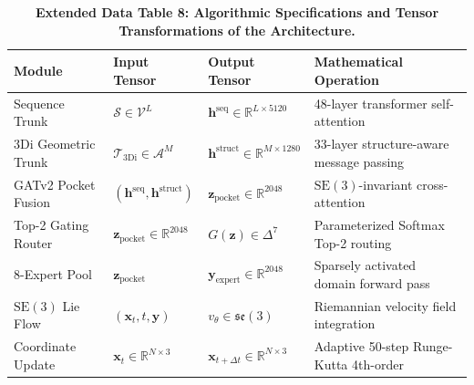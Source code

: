 \documentclass[11pt,a4paper]{article}
\begin{document}
\begin{table}[h!]
\caption{\textbf{Extended Data Table 8: Algorithmic Specifications and Tensor Transformations of the Architecture.}}
\label{tab:ed_tensors}
\centering
\small
\begin{tabular}{lllp{5.5cm}}
\toprule
\textbf{Module} & \textbf{Input Tensor} & \textbf{Output Tensor} & \textbf{Mathematical Operation} \\
\midrule
Sequence Trunk & $\mathcal{S} \in \mathcal{V}^L$ & $\mathbf{h}^{\text{seq}} \in \mathbb{R}^{L \times 5120}$ & 48-layer transformer self-attention \\
3Di Geometric Trunk & $\mathcal{T}_{\text{3Di}} \in \mathcal{A}^M$ & $\mathbf{h}^{\text{struct}} \in \mathbb{R}^{M \times 1280}$ & 33-layer structure-aware message passing \\
GATv2 Pocket Fusion & $(\mathbf{h}^{\text{seq}}, \mathbf{h}^{\text{struct}})$ & $\mathbf{z}_{\text{pocket}} \in \mathbb{R}^{2048}$ & $\mathrm{SE}(3)$-invariant cross-attention \\
Top-2 Gating Router & $\mathbf{z}_{\text{pocket}} \in \mathbb{R}^{2048}$ & $G(\mathbf{z}) \in \Delta^7$ & Parameterized Softmax Top-2 routing \\
8-Expert Pool & $\mathbf{z}_{\text{pocket}}$ & $\mathbf{y}_{\text{expert}} \in \mathbb{R}^{2048}$ & Sparsely activated domain forward pass \\
$\mathrm{SE}(3)$ Lie Flow & $(\mathbf{x}_t, t, \mathbf{y})$ & $v_\theta \in \mathfrak{se}(3)$ & Riemannian velocity field integration \\
Coordinate Update & $\mathbf{x}_t \in \mathbb{R}^{N \times 3}$ & $\mathbf{x}_{t+\Delta t} \in \mathbb{R}^{N \times 3}$ & Adaptive 50-step Runge-Kutta 4th-order \\
\bottomrule
\end{tabular}
\end{table}

\vspace{1em}
\end{document}
